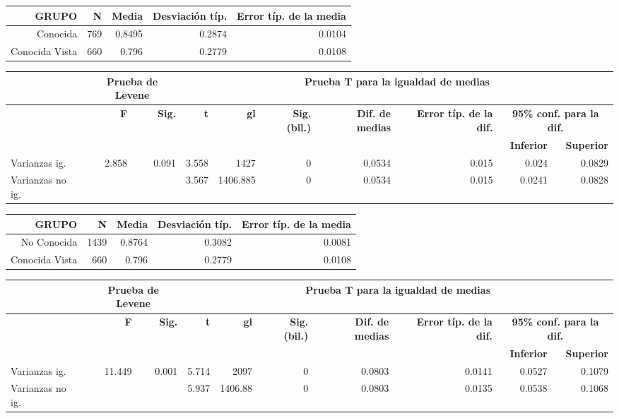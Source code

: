 \documentclass[10pt]{beamer}
\begin{document}
\begin{frame}
	\begin{table}
	  \begin{tabular}[t]{|r|r|r|r|r|}
	    \hline
		\textbf{GRUPO} & \textbf{N} & \textbf{Media} & \textbf{Desviación típ.} & \textbf{Error típ. de la media} \\ \hline
		Conocida  & 769 & 0.8495 & 0.2874 & 0.0104 \\ \hline
		Conocida Vista & 660 & 0.796 & 0.2779 & 0.0108 \\ \hline
	  \end{tabular}
	  \begin{tabular}[t]{|l|r|r|r|r|r|r|r|r|r|}
	    \hline
		  & \multicolumn{2}{|c|}{\textbf{Prueba de Levene}} &  \multicolumn{7}{|c|}{\textbf{Prueba T para la igualdad de medias}} \\ \hline
		  & \textbf{F} & \textbf{Sig.} & \textbf{t} & \textbf{gl} & \textbf{Sig. (bil.)} & \textbf{Dif. de medias} & \textbf{Error típ. de la dif.} & \multicolumn{2}{|c|}{\textbf{95\% conf. para la dif.}} \\ \hline
		  &   &   &   &   &   &   &   & \textbf{Inferior} & \textbf{Superior} \\ \hline
	    Varianzas ig. & 2.858 & 0.091 & 3.558 & 1427 & 0 & 0.0534 & 0.015 & 0.024 & 0.0829 \\ \hline
	    Varianzas no ig. &   &   & 3.567 & 1406.885 & 0 & 0.0534 & 0.015 & 0.0241 & 0.0828 \\ \hline
	  \end{tabular}
	\end{table}

	\begin{table}
	  \begin{tabular}[t]{|r|r|r|r|r|}
	    \hline
		\textbf{GRUPO} & \textbf{N} & \textbf{Media} & \textbf{Desviación típ.} & \textbf{Error típ. de la media} \\ \hline
		No Conocida & 1439 & 0.8764 & 0.3082 & 0.0081 \\ \hline
		Conocida Vista & 660 & 0.796 & 0.2779 & 0.0108 \\ \hline

	  \end{tabular}
	  \begin{tabular}[t]{|l|r|r|r|r|r|r|r|r|r|}
	    \hline
		  & \multicolumn{2}{|c|}{\textbf{Prueba de Levene}} &  \multicolumn{7}{|c|}{\textbf{Prueba T para la igualdad de medias}} \\ \hline
		  & \textbf{F} & \textbf{Sig.} & \textbf{t} & \textbf{gl} & \textbf{Sig. (bil.)} & \textbf{Dif. de medias} & \textbf{Error típ. de la dif.} & \multicolumn{2}{|c|}{\textbf{95\% conf. para la dif.}} \\ \hline
		  &   &   &   &   &   &   &   & \textbf{Inferior} & \textbf{Superior} \\ \hline
	Varianzas ig. & 11.449 & 0.001 & 5.714 & 2097 & 0 & 0.0803 & 0.0141 & 0.0527 & 0.1079 \\ \hline
	Varianzas no ig. &   &   & 5.937 & 1406.88 & 0 & 0.0803 & 0.0135 & 0.0538 & 0.1068 \\ \hline
	  \end{tabular}
	\end{table}
      \end{frame}
\end{document}
